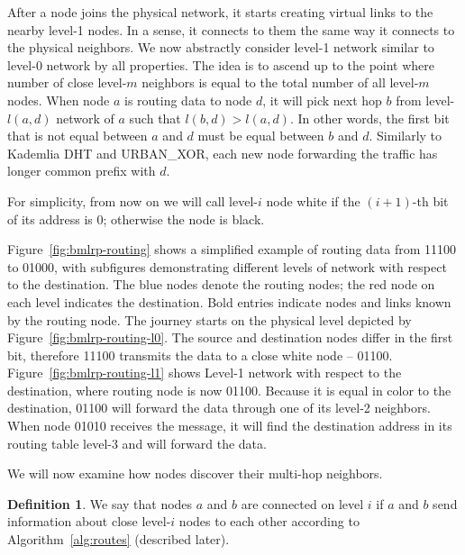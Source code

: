 \documentclass[14pt]{extarticle}
\theoremstyle{definition}
\newtheorem{defn}{Definition}
\newcommand{\urbanxor}{URBAN\_XOR}
\begin{document}
After a node joins the physical network, it starts creating virtual links to the nearby level-1 nodes. In a sense, it connects to them the same way it connects to the physical neighbors. We now abstractly consider level-1 network similar to level-0 network by all properties. The idea is to ascend up to the point where number of close level-$m$ neighbors is equal to the total number of all level-$m$ nodes. When node $a$ is routing data to node $d$, it will pick next hop $b$ from level-$l(a,d)$ network of $a$ such that $l(b,d) > l(a,d)$. In other words, the first bit that is not equal between $a$ and $d$ must be equal between $b$ and $d$. Similarly to Kademlia DHT and \urbanxor, each new node forwarding the traffic has longer common prefix with $d$.

For simplicity, from now on we will call level-$i$ node white if the $(i+1)$-th bit of its address is 0; otherwise the node is black.

Figure~\ref{fig:bmlrp-routing} shows a simplified example of routing data from 11100 to 01000, with subfigures demonstrating different levels of network with respect to the destination. The blue nodes denote the routing nodes; the red node on each level indicates the destination. Bold entries indicate nodes and links known by the routing node. The journey starts on the physical level depicted by Figure~\ref{fig:bmlrp-routing-l0}. The source and destination nodes differ in the first bit, therefore 11100 transmits the data to a close white node -- 01100. Figure~\ref{fig:bmlrp-routing-l1} shows Level-1 network with respect to the destination, where routing node is now 01100. Because it is equal in color to the destination, 01100 will forward the data through one of its level-2 neighbors. When node 01010 receives the message, it will find the destination address in its routing table level-3 and will forward the data.



We will now examine how nodes discover their multi-hop neighbors.

\begin{defn}
    We say that nodes $a$ and $b$ are connected on level $i$ if $a$ and $b$ send information about close level-$i$ nodes to each other according to Algorithm~\ref{alg:routes} (described later).
    
    \label{defn:connected}
\end{defn}
\end{document}
